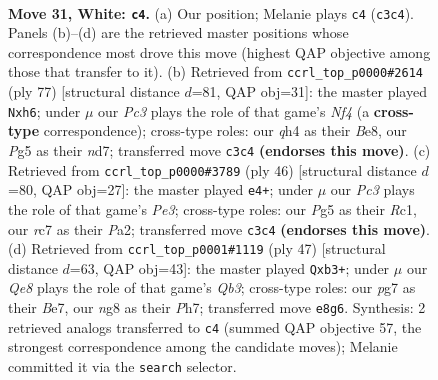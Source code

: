 \documentclass[11pt]{article}
\begin{document}
\clearpage

\begin{figure}[p]\centering
\begin{subfigure}{0.46\textwidth}\centering
\resizebox{\linewidth}{!}{%
\newchessgame
\chessboard[
  setfen={4Q1nr/1kr3p1/8/2p3Pp/5P1q/N1P5/PP4K1/1RB5 w - - 4 31},
  showmover=false,
  pgfstyle=straightmove, color=movearrow, markmove={c3-c4}
]}
\caption{}
\end{subfigure}\hfill
\begin{subfigure}{0.46\textwidth}\centering
\resizebox{\linewidth}{!}{%
\newchessgame
\chessboard[
  setfen={4b1k1/1p1N1pp1/4p2P/5n2/2P5/7R/2PR1K1P/7r b - - 0 39},
  showmover=false,
  pgfstyle=straightmove, color=movearrow, markmove={f5-h6}
]}
\caption{}
\end{subfigure}
\\[4pt]
\begin{subfigure}{0.46\textwidth}\centering
\resizebox{\linewidth}{!}{%
\newchessgame
\chessboard[
  setfen={2r4r/p3b3/q6p/2pknQ2/8/1N2P1P1/PP3P1P/2R3K1 w - - 1 24},
  showmover=false,
  pgfstyle=straightmove, color=movearrow, markmove={e3-e4}
]}
\caption{}
\end{subfigure}\hfill
\begin{subfigure}{0.46\textwidth}\centering
\resizebox{\linewidth}{!}{%
\newchessgame
\chessboard[
  setfen={4k2r/4b2p/1qnp1p1Q/4pP2/6P1/1P6/4N1BP/1K1R3R b k - 0 24},
  showmover=false,
  pgfstyle=straightmove, color=movearrow, markmove={b6-b3}
]}
\caption{}
\end{subfigure}
\caption{\textbf{Move 31, White: \texttt{c4}.} (a) Our position; Melanie plays \texttt{c4} (\texttt{c3c4}). Panels (b)--(d) are the retrieved master positions whose correspondence most drove this move (highest QAP objective among those that transfer to it). (b) Retrieved from \texttt{ccrl\_top\_p0000\#2614} (ply 77) [structural distance $d$=81, QAP obj=31]: the master played \texttt{Nxh6}; under $\mu$ our \emph{Pc3} plays the role of that game's \emph{Nf4} (a \textbf{cross-type} correspondence); cross-type roles: our \emph{q}h4 as their \emph{B}e8, our \emph{P}g5 as their \emph{n}d7; transferred move \texttt{c3c4} \textbf{(endorses this move)}. (c) Retrieved from \texttt{ccrl\_top\_p0000\#3789} (ply 46) [structural distance $d$=80, QAP obj=27]: the master played \texttt{e4+}; under $\mu$ our \emph{Pc3} plays the role of that game's \emph{Pe3}; cross-type roles: our \emph{P}g5 as their \emph{R}c1, our \emph{r}c7 as their \emph{P}a2; transferred move \texttt{c3c4} \textbf{(endorses this move)}. (d) Retrieved from \texttt{ccrl\_top\_p0001\#1119} (ply 47) [structural distance $d$=63, QAP obj=43]: the master played \texttt{Qxb3+}; under $\mu$ our \emph{Qe8} plays the role of that game's \emph{Qb3}; cross-type roles: our \emph{p}g7 as their \emph{B}e7, our \emph{n}g8 as their \emph{P}h7; transferred move \texttt{e8g6}. Synthesis: 2 retrieved analogs transferred to \texttt{c4} (summed QAP objective 57, the strongest correspondence among the candidate moves); Melanie committed it via the \texttt{search} selector.}
\label{fig:thought-m60}
\end{figure}
\end{document}
